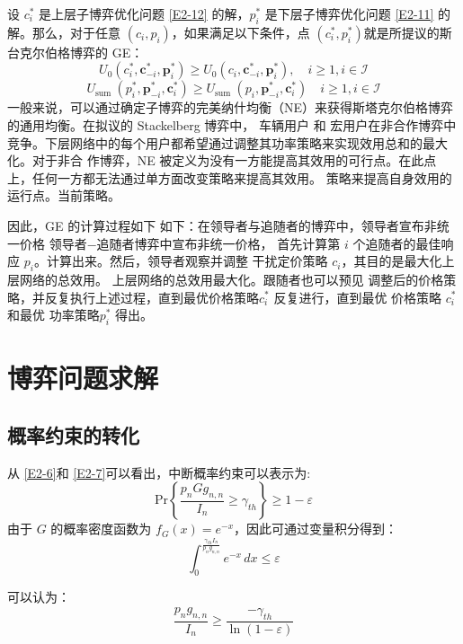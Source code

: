 设 $c_i^*$ 是上层子博弈优化问题 \eqref{E2-12} 的解，$p_i^*$ 是下层子博弈优化问题 \eqref{E2-11} 的解。那么，对于任意 $(c_i,p_i)$，如果满足以下条件，点 $(c_i^*,p_i^*)$就是所提议的斯台克尔伯格博弈的 GE：
\begin{equation}
U_0\left(c_i^*, \mathbf{c}_{-i}^*, \mathbf{p}_i^*\right) \geq U_0\left(c_i, \mathbf{c}_{-i}^*, \mathbf{p}_i^*\right), \quad i \geq 1, i \in \mathcal{I}
\end{equation}
\begin{equation}
U_{\text {sum }}\left(p_i^*, \mathbf{p}_{-i}^*, \mathbf{c}_i^*\right) \geq U_{\text {sum }}\left(p_i, \mathbf{p}_{-i}^*, \mathbf{c}_i^*\right) \quad i \geq 1, i \in \mathcal{I}
\end{equation}
一般来说，可以通过确定子博弈的完美纳什均衡（NE）来获得斯塔克尔伯格博弈的通用均衡。在拟议的 Stackelberg 博弈中，
车辆用户 和 宏用户在非合作博弈中竞争。下层网络中的每个用户都希望通过调整其功率策略来实现效用总和的最大化。对于非合
作博弈，NE 被定义为没有一方能提高其效用的可行点。在此点上，任何一方都无法通过单方面改变策略来提高其效用。
策略来提高自身效用的运行点。当前策略。

因此，GE 的计算过程如下 如下：在领导者与追随者的博弈中，领导者宣布非统一价格 领导者$-$追随者博弈中宣布非统一价格，
首先计算第 $i$ 个追随者的最佳响应 $p_i$。计算出来。然后，领导者观察并调整 干扰定价策略 $c_i$，其目的是最大化上层网络的总效用。
上层网络的总效用最大化。跟随者也可以预见 调整后的价格策略，并反复执行上述过程，直到最优价格策略$c_i^*$ 反复进行，直到最优
价格策略 $c_i^*$ 和最优 功率策略$p_i^*$ 得出。
\section{博弈问题求解}\label{section2-3}
\subsection{概率约束的转化}\label{section2-3-1}
从 \eqref{E2-6}和 \eqref{E2-7}可以看出，中断概率约束可以表示为:
\begin{equation}\label{E2-13}
\textrm{Pr}\left\{\frac{p_{n}G g_{n,n}}{I_n} \geq \gamma_{th}\right\}\geq1-\varepsilon
\end{equation}
由于 $G$ 的概率密度函数为 $f_G (x)=e^{-x}$，因此可通过变量积分得到：
\begin{equation}\label{E2-14}
\int_{0}^{\frac{\gamma_{th}I_{n}}{p_n g_{n,n}}} e^{-x}\, dx\leq\varepsilon
\end{equation}

可以认为：
\begin{equation}\label{E2-15}
\frac{p_n g_{ n,n}}{I_{n}}\geq\frac{-\gamma_{th}}{\ln(1-\varepsilon)}
\end{equation}

